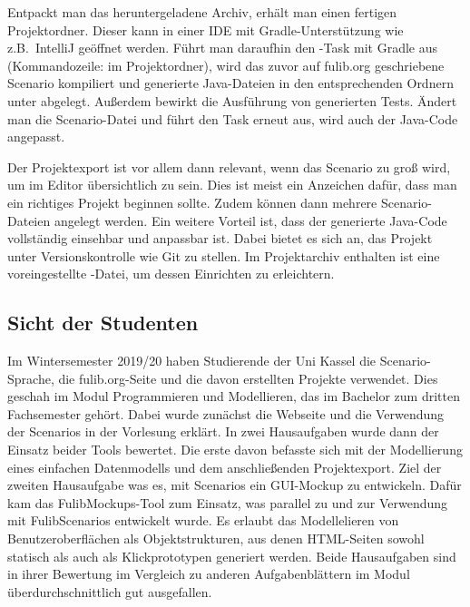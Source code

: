 Entpackt man das heruntergeladene Archiv, erhält man einen fertigen Projektordner.
Dieser kann in einer IDE mit Gradle-Unterstützung wie z.B.\ IntelliJ geöffnet werden.
Führt man daraufhin den -Task mit Gradle aus (Kommandozeile:  im Projektordner),
wird das zuvor auf fulib.org geschriebene Scenario kompiliert und generierte Java-Dateien in den entsprechenden Ordnern unter  abgelegt.
Außerdem bewirkt  die Ausführung von generierten Tests.
Ändert man die Scenario-Datei und führt den Task erneut aus, wird auch der Java-Code angepasst.


Der Projektexport ist vor allem dann relevant, wenn das Scenario zu groß wird, um im Editor übersichtlich zu sein.
Dies ist meist ein Anzeichen dafür, dass man ein richtiges Projekt beginnen sollte.
Zudem können dann mehrere Scenario-Dateien angelegt werden.
Ein weitere Vorteil ist, dass der generierte Java-Code vollständig einsehbar und anpassbar ist.
Dabei bietet es sich an, das Projekt unter Versionskontrolle wie Git zu stellen.
Im Projektarchiv enthalten ist eine voreingestellte -Datei, um dessen Einrichten zu erleichtern.

\subsection{Sicht der Studenten}\label{subsec:students-view}

Im Wintersemester 2019/20 haben Studierende der Uni Kassel die Scenario-Sprache, die fulib.org-Seite und die davon erstellten Projekte verwendet.
Dies geschah im Modul Programmieren und Modellieren, das im Bachelor zum dritten Fachsemester gehört.
Dabei wurde zunächst die Webseite und die Verwendung der Scenarios in der Vorlesung erklärt.
In zwei Hausaufgaben wurde dann der Einsatz beider Tools bewertet.
Die erste davon befasste sich mit der Modellierung eines einfachen Datenmodells und dem anschließenden Projektexport.
Ziel der zweiten Hausaufgabe was es, mit Scenarios ein GUI-Mockup zu entwickeln.
Dafür kam das FulibMockups-Tool zum Einsatz, was parallel zu und zur Verwendung mit FulibScenarios entwickelt wurde.
Es erlaubt das Modellelieren von Benutzeroberflächen als Objektstrukturen,
aus denen HTML-Seiten sowohl statisch als auch als Klickprototypen generiert werden.
Beide Hausaufgaben sind in ihrer Bewertung im Vergleich zu anderen Aufgabenblättern im Modul überdurchschnittlich gut ausgefallen.

